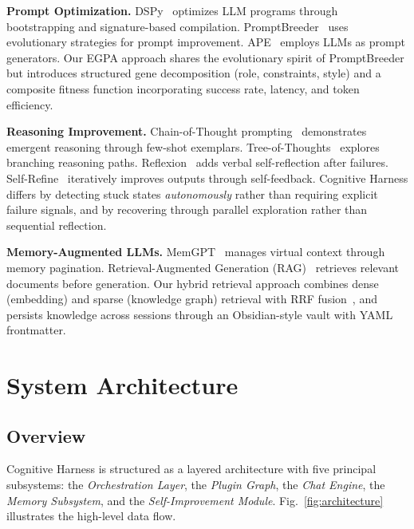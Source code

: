 \documentclass[conference]{IEEEtran}
\begin{document}
\textbf{Prompt Optimization.} DSPy~\cite{khattab2023dspy} optimizes LLM programs through bootstrapping and signature-based compilation. PromptBreeder~\cite{fernando2023promptbreeder} uses evolutionary strategies for prompt improvement. APE~\cite{zhou2023large} employs LLMs as prompt generators. Our EGPA approach shares the evolutionary spirit of PromptBreeder but introduces structured gene decomposition (role, constraints, style) and a composite fitness function incorporating success rate, latency, and token efficiency.

\textbf{Reasoning Improvement.} Chain-of-Thought prompting~\cite{wei2022chain} demonstrates emergent reasoning through few-shot exemplars. Tree-of-Thoughts~\cite{yao2024tree} explores branching reasoning paths. Reflexion~\cite{shinn2023reflexion} adds verbal self-reflection after failures. Self-Refine~\cite{madaan2023selfrefine} iteratively improves outputs through self-feedback. Cognitive Harness differs by detecting stuck states \emph{autonomously} rather than requiring explicit failure signals, and by recovering through parallel exploration rather than sequential reflection.

\textbf{Memory-Augmented LLMs.} MemGPT~\cite{packer2023memgpt} manages virtual context through memory pagination. Retrieval-Augmented Generation (RAG)~\cite{lewis2020rag} retrieves relevant documents before generation. Our hybrid retrieval approach combines dense (embedding) and sparse (knowledge graph) retrieval with RRF fusion~\cite{cormack2009reciprocal}, and persists knowledge across sessions through an Obsidian-style vault with YAML frontmatter.

\section{System Architecture}
\label{sec:architecture}

\subsection{Overview}

Cognitive Harness is structured as a layered architecture with five principal subsystems: the \emph{Orchestration Layer}, the \emph{Plugin Graph}, the \emph{Chat Engine}, the \emph{Memory Subsystem}, and the \emph{Self-Improvement Module}. Fig.~\ref{fig:architecture} illustrates the high-level data flow.
\end{document}
